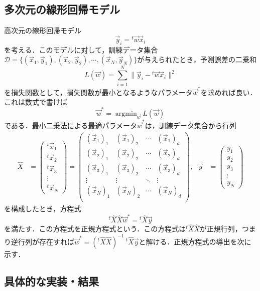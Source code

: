 \subsection{多次元の線形回帰モデル}
高次元の線形回帰モデル
\begin{equation}
    \vec{y}_i={}^t\vec{w}\vec{x}_i
\end{equation}
を考える．このモデルに対して，訓練データ集合$\mathcal{D}=\{(\vec{x}_1,\vec{y}_1),(\vec{x}_2,\vec{y}_2),\cdots,(\vec{x}_N,\vec{y}_N)\}$が与えられたとき，予測誤差の二乗和
\begin{equation}
    L(\vec{w}) = \sum_{i=1}^{N}\|\vec{y}_i-{}^t\vec{w}\vec{x}_i\|^2
\end{equation}
を損失関数として，損失関数が最小となるようなパラメータ$\vec{w}^{\ast}$を求めれば良い．これは数式で書けば
\begin{equation}
    \vec{w}^{\ast} = \mathop{\arg\min}_{\vec{w}} L(\vec{w})
\end{equation}
である．最小二乗法による最適パラメータ$\vec{w}^{\ast}$は，訓練データ集合から行列
\begin{align}
    \hat{X}
    &
    =\left(
        \begin{array}{c}
       {}^t\vec{x}_1\\[5pt]
       {}^t\vec{x}_2\\[5pt]
       {}^t\vec{x}_3\\[5pt]
       \vdots\\[5pt]
       {}^t\vec{x}_N
        \end{array}
    \right)
    =
    \left(
        \begin{array}{cccc}
       (\vec{x}_1)_1&(\vec{x}_1)_2&\cdots&(\vec{x}_1)_d\\[10pt]
       (\vec{x}_2)_1&(\vec{x}_2)_2&\cdots&(\vec{x}_2)_d\\[10pt]
       (\vec{x}_3)_1&(\vec{x}_3)_2&\cdots&(\vec{x}_3)_d\\[10pt]
       \vdots&\vdots&\ddots&\vdots\\[10pt]
       (\vec{x}_N)_1&(\vec{x}_N)_2&\cdots&(\vec{x}_N)_d\\[10pt]
        \end{array}
    \right),\ \ \ 
    \vec{y}
    &
    =\left(
        \begin{array}{c}
       {y}_1\\[5pt]
       {y}_2\\[5pt]
       {y}_3\\[5pt]
       \vdots\\[5pt]
       {y}_N
        \end{array}
    \right)
\end{align}
を構成したとき，方程式
\begin{equation}
    {}^t\hat{X}\hat{X}\vec{w}^\ast = {}^t\hat{X}\vec{y}
\end{equation}
を満たす．この方程式を正規方程式という．この方程式は${}^t\hat{X}\hat{X}$が正規行列，つまり逆行列が存在すれば$\vec{w}^\ast = ({}^t\hat{X}\hat{X})^{-1}\ {}^t\hat{X}\vec{y}$と解ける．正規方程式の導出を次に示す．
\subsection{具体的な実装・結果}